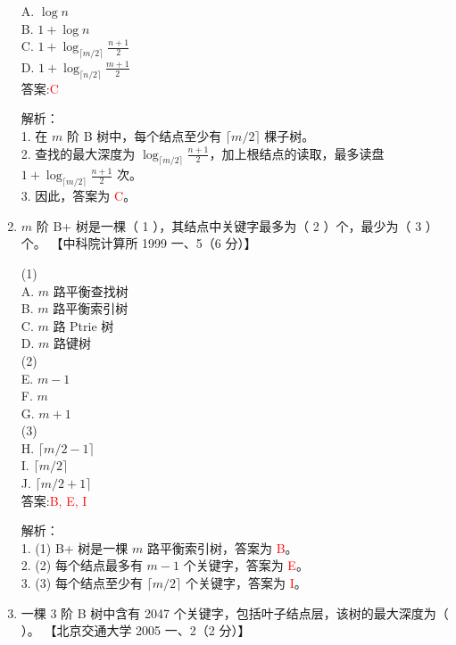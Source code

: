 \documentclass[lang=cn,newtx,10pt,scheme=chinese]{../../../elegantbook}
\begin{document}
\begin{enumerate}
    A. $\log n$ \\  
    B. $1 + \log n$ \\  
    C. $1 + \log_{\lceil m/2 \rceil} \frac{n+1}{2}$ \\  
    D. $1 + \log_{\lceil n/2 \rceil} \frac{m+1}{2}$ \\  

    答案:\textcolor{red}{C}

    解析：\\
    1. 在 $m$ 阶 B 树中，每个结点至少有 $\lceil m/2 \rceil$ 棵子树。\\
    2. 查找的最大深度为 $\log_{\lceil m/2 \rceil} \frac{n+1}{2}$，加上根结点的读取，最多读盘 $1 + \log_{\lceil m/2 \rceil} \frac{n+1}{2}$ 次。\\
    3. 因此，答案为 \textcolor{red}{C}。\\

\item $m$ 阶 B+ 树是一棵（ 1 ），其结点中关键字最多为（ 2 ）个，最少为（ 3 ）个。  
    【中科院计算所 1999 一、5（6 分）】  

    (1) \\  
    A. $m$ 路平衡查找树 \\  
    B. $m$ 路平衡索引树 \\  
    C. $m$ 路 Ptrie 树 \\  
    D. $m$ 路键树 \\  

    (2) \\  
    E. $m-1$ \\  
    F. $m$ \\  
    G. $m+1$ \\  

    (3) \\  
    H. $\lceil m/2 - 1 \rceil$ \\  
    I. $\lceil m/2 \rceil$ \\  
    J. $\lceil m/2 + 1 \rceil$ \\  

    答案:\textcolor{red}{B, E, I}

    解析：\\
    1. (1) B+ 树是一棵 $m$ 路平衡索引树，答案为 \textcolor{red}{B}。\\
    2. (2) 每个结点最多有 $m-1$ 个关键字，答案为 \textcolor{red}{E}。\\
    3. (3) 每个结点至少有 $\lceil m/2 \rceil$ 个关键字，答案为 \textcolor{red}{I}。\\

\item 一棵 3 阶 B 树中含有 2047 个关键字，包括叶子结点层，该树的最大深度为（ ）。  
    【北京交通大学 2005 一、2（2 分）】  


\end{enumerate}
\end{document}
